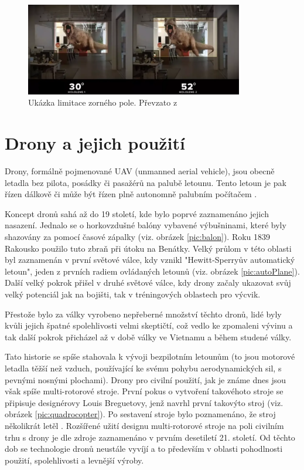 \begin{figure}[ht] 
	\centering
	\includegraphics[width=0.85\textwidth]{obrazky-figures/ar/Hololens-2-fov.png}
	\caption{Ukázka limitace zorného pole. Převzato z \cite{hololens1/2difrences}}
	\label{pic:hololens2Fov}
\end{figure}

\chapter{Drony a jejich použití }
Drony, formálně pojmenované UAV (unmanned aerial vehicle), jsou obecně letadla bez pilota, posádky či pasažérů na palubě letounu. Tento letoun je pak řízen dálkově či může být řízen plně autonomně palubním počítačem \cite{UAVMeaning}. 

Koncept dronů sahá až do 19 století, kde bylo poprvé  zaznamenáno jejich nasazení. Jednalo se o horkovzdušné balóny vybavené výbušninami, které byly shazovány za pomocí časové zápalky (viz. obrázek \ref{pic:balon}). Roku 1839 Rakousko použilo tuto zbraň při útoku na Benátky. Velký průlom v této oblasti byl zaznamenán v první světové válce, kdy vznikl "Hewitt-Sperryův automatický letoun", jeden z prvních radiem ovládaných letounů (viz. obrázek \ref{pic:autoPlane}). Další velký pokrok přišel v druhé světové válce, kdy drony začaly ukazovat svůj velký potenciál jak na bojišti, tak v tréningových oblastech pro výcvik.

Přestože bylo za války vyrobeno nepřeberné množství těchto dronů, lidé byly kvůli jejich špatné spolehlivosti velmi skeptičtí, což vedlo ke zpomaleni vývinu a tak další pokrok přicházel až v době války ve Vietnamu a během studené války. \cite{DroneHistory,DroneHistory2WWX,DroneKatogorySouhrn,DroneHistory3} 

Tato historie se spíše stahovala k vývoji bezpilotním letounům (to jsou motorové letadla těžší než vzduch, používající ke svému pohybu aerodynamických sil, s pevnými nosnými plochami). Drony pro civilní použití, jak je známe dnes jsou však spíše multi-rotorové stroje. První pokus o vytvoření takovéhoto stroje se připisuje designérovy Louis Breguetovy, jenž navrhl první takovýto stroj (viz. obrázek \ref{pic:quadrocopter}). Po sestavení stroje bylo poznamenáno, že stroj několikrát letěl \cite{Quadcopter}. Rozšířené užití designu multi-rotorové stroje  na poli civilním trhu s drony je dle zdroje \cite{DroneHistory3} zaznamenáno v prvním desetiletí 21. století. Od těchto dob se technologie dronů neustále vyvíjí a to především  v oblasti pohodlnosti použití, spolehlivosti a levnější výroby.


